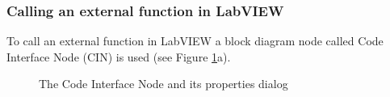 \subsubsection{Calling an external function in LabVIEW}
\label{section:callingExtFunction}
To call an external function in LabVIEW a block diagram node called Code Interface Node (CIN) is used \cite{ExtCodeLabView} (see Figure \ref{figure:CIN}a). 
 \begin{figure}[h!]
   \centering
     \caption{The Code Interface Node and its properties dialog}
     \label{figure:CIN}
  \end{figure}

